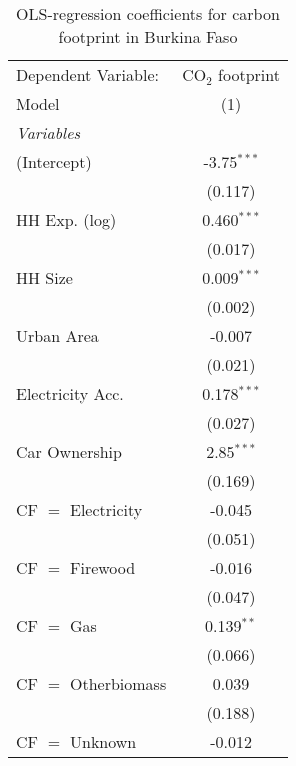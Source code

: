 
\begin{table}[htbp!]
   \centering
   \small
   \begin{adjustbox}{width = 1\textwidth, max height = 0.95\textheight, center}
      \begin{threeparttable}[b]
         \caption{\label{tab:OLS_2_BFA} OLS-regression coefficients for carbon footprint in Burkina Faso}
         \begin{tabular}{lc}
            \tabularnewline \midrule \midrule
            Dependent Variable: & CO$_{2}$ footprint\\  
            Model               & (1)\\  
            \midrule
            \emph{Variables}\\
            (Intercept)         & -3.75$^{***}$\\   
                                & (0.117)\\   
            HH Exp. (log)       & 0.460$^{***}$\\   
                                & (0.017)\\   
            HH Size             & 0.009$^{***}$\\   
                                & (0.002)\\   
            Urban Area          & -0.007\\   
                                & (0.021)\\   
            Electricity Acc.    & 0.178$^{***}$\\   
                                & (0.027)\\   
            Car Ownership       & 2.85$^{***}$\\   
                                & (0.169)\\   
            CF $=$ Electricity  & -0.045\\   
                                & (0.051)\\   
            CF $=$ Firewood     & -0.016\\   
                                & (0.047)\\   
            CF $=$ Gas          & 0.139$^{**}$\\   
                                & (0.066)\\   
            CF $=$ Otherbiomass & 0.039\\   
                                & (0.188)\\   
            CF $=$ Unknown      & -0.012\\   

\end{tabular}
\end{threeparttable}
\end{adjustbox}
\end{table}

